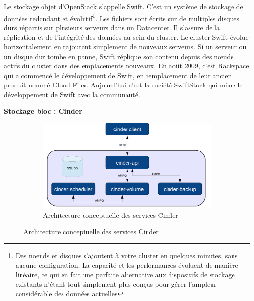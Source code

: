 \documentclass{article}
\begin{document}
Le stockage objet d'OpenStack s'appelle Swift. C'est un système de stockage de données redondant et évolutif\footnote{Des noeuds et disques s’ajoutent à votre cluster en quelques minutes, sans aucune configuration. La capacité et les performances évoluent de manière linéaire, ce qui en fait une parfaite alternative aux dispositifs de stockage existants n'étant tout simplement plus conçus pour gérer l'ampleur considérable des données actuelles}.
Les fichiers sont écrits sur de multiples disques durs répartis sur plusieurs serveurs dans un Datacenter. Il s'assure de la réplication et de l'intégrité des données au sein du cluster. Le cluster Swift évolue horizontalement en rajoutant simplement de nouveaux serveurs. Si un serveur ou un disque dur tombe en panne, Swift réplique son contenu depuis des nœuds actifs du cluster dans des emplacements nouveaux.
\newline
En août 2009, c'est Rackspace qui a commencé le développement de Swift, en remplacement de leur ancien produit nommé Cloud Files. Aujourd'hui c'est la société SwiftStack qui mène le développement de Swift avec la communauté.

\newpage
\textbf{Stockage bloc : Cinder}
\newline

\begin{figure}[h!]
	\centering
  	\begin{subfigure}[b]{1.0\linewidth}
	\includegraphics[width=\linewidth]{cinder.png}
	\caption{Architecture conceptuelle des services Cinder}
  	\end{subfigure}
\end{figure}
\end{document}
